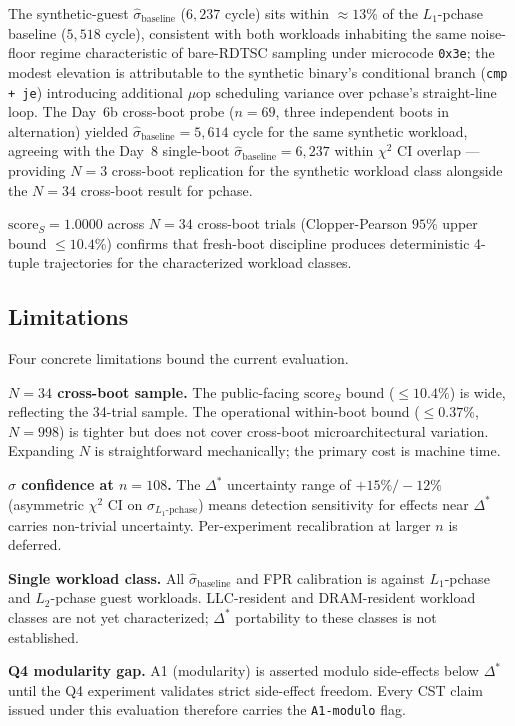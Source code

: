 \documentclass[conference]{IEEEtran}
\newcommand{\sigbase}{\hat{\sigma}_\text{baseline}}
\newcommand{\Dstar}{\Delta^{*}}
\newcommand{\scoreS}{\text{score}_S}
\begin{document}
The synthetic-guest $\sigbase$ ($6{,}237$ cycle) sits within
${\approx}13\%$ of the $L_1$-pchase baseline ($5{,}518$ cycle),
consistent with both workloads inhabiting the same noise-floor
regime characteristic of bare-RDTSC sampling under microcode
\texttt{0x3e}; the modest elevation is attributable to the synthetic
binary's conditional branch (\texttt{cmp + je}) introducing
additional $\mu$op scheduling variance over pchase's straight-line
loop. The Day~6b cross-boot probe ($n{=}69$, three independent boots
in alternation) yielded $\sigbase = 5{,}614$ cycle for the same
synthetic workload, agreeing with the Day~8 single-boot
$\sigbase = 6{,}237$ within $\chi^2$ CI overlap --- providing $N{=}3$
cross-boot replication for the synthetic workload class alongside
the $N{=}34$ cross-boot result for pchase.

$\scoreS = 1.0000$ across $N{=}34$ cross-boot trials (Clopper-Pearson
$95\%$ upper bound $\leq 10.4\%$) confirms that fresh-boot discipline
produces deterministic 4-tuple trajectories for the characterized
workload classes.

\subsection{Limitations}\label{sec:eval-lim}

Four concrete limitations bound the current evaluation.

\textbf{$N{=}34$ cross-boot sample.} The public-facing $\scoreS$
bound ($\leq 10.4\%$) is wide, reflecting the 34-trial sample. The
operational within-boot bound ($\leq 0.37\%$, $N{=}998$) is tighter
but does not cover cross-boot microarchitectural variation.
Expanding $N$ is straightforward mechanically; the primary cost is
machine time.

\textbf{$\hat{\sigma}$ confidence at $n{=}108$.} The $\Dstar$
uncertainty range of $+15\%/{-}12\%$ (asymmetric $\chi^2$ CI on
$\hat{\sigma}_{L_1\text{-pchase}}$) means detection sensitivity for
effects near $\Dstar$ carries non-trivial uncertainty. Per-experiment
recalibration at larger $n$ is deferred.

\textbf{Single workload class.} All $\sigbase$ and FPR calibration
is against $L_1$-pchase and $L_2$-pchase guest workloads.
LLC-resident and DRAM-resident workload classes are not yet
characterized; $\Dstar$ portability to these classes is not
established.

\textbf{Q4 modularity gap.} A1 (modularity) is asserted modulo
side-effects below $\Dstar$ until the Q4 experiment validates strict
side-effect freedom. Every CST claim issued under this evaluation
therefore carries the \texttt{A1-modulo} flag.
\end{document}
